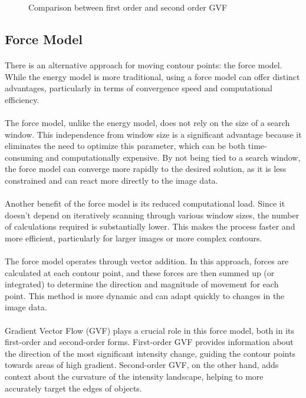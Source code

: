 \documentclass[12pt,a4paper]{report}
\begin{document}
\begin{figure}[!]
\begin{minipage}{\linewidth}
        \caption{Comparison between first order and second order GVF}
    \end{minipage}

\end{figure}


\subsection{Force Model}
\paragraph*{}
There is an alternative approach for moving contour points: the force model. While the energy model is more traditional, using a force model can offer distinct advantages, particularly in terms of convergence speed and computational efficiency.
\paragraph*{}
The force model, unlike the energy model, does not rely on the size of a search window. This independence from window size is a significant advantage because it eliminates the need to optimize this parameter, which can be both time-consuming and computationally expensive. By not being tied to a search window, the force model can converge more rapidly to the desired solution, as it is less constrained and can react more directly to the image data.
\paragraph*{}
Another benefit of the force model is its reduced computational load. Since it doesn't depend on iteratively scanning through various window sizes, the number of calculations required is substantially lower. This makes the process faster and more efficient, particularly for larger images or more complex contours.
\paragraph*{}
The force model operates through vector addition. In this approach, forces are calculated at each contour point, and these forces are then summed up (or integrated) to determine the direction and magnitude of movement for each point. This method is more dynamic and can adapt quickly to changes in the image data.
\paragraph*{}
Gradient Vector Flow (GVF) plays a crucial role in this force model, both in its first-order and second-order forms. First-order GVF provides information about the direction of the most significant intensity change, guiding the contour points towards areas of high gradient. Second-order GVF, on the other hand, adds context about the curvature of the intensity landscape, helping to more accurately target the edges of objects.
\end{document}
